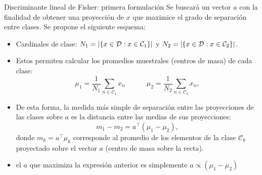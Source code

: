 \documentclass[9pt, handout]{beamer}
\begin{document}
\begin{frame}{Discriminante lineal de Fisher: primera formulación}
Se buscará un vector $a$ con la finalidad de obtener una proyección de $x$ que maximice el grado de separación entre clases. Se propone el siguiente esquema:\pause

\begin{itemize}
	\item Cardinales de clase: $N_1 = |\{x\in{\mathcal D}:x\in{\mathcal C}_1\}|$ y $N_2 = |\{x\in{\mathcal D}:x\in{\mathcal C}_2\}|$.\pause
	\item Estos permiten calcular los promedios muestrales (centros de masa) de cada clase: 
\begin{equation*}
	\mu_1=\frac{1}{N_1}\sum_{n\in\mathcal{C}_1}x_n
	\quad\quad\quad
	\mu_2=\frac{1}{N_2}\sum_{n\in\mathcal{C}_2}x_n,
\end{equation*}
\pause
	\item De esta forma, la medida más simple de separación entre las proyecciones de las clases sobre $a$ es la distancia entre las medias  de sus proyecciones:
\begin{equation*}
	m_1 - m_2 = a^\top(\mu_1-\mu_2),
\end{equation*}
donde $m_k= a^\top\mu_k$ corresponde al promedio de los elementos de  la clase $\mathcal{C}_k$ proyectado sobre el  vector $a$ (centro de masa sobre la recta).
	\item el $a$  que maximiza la expresión anterior es simplemente $a\propto (\mu_1-\mu_2)$
\end{itemize}

\end{frame}
\end{document}

